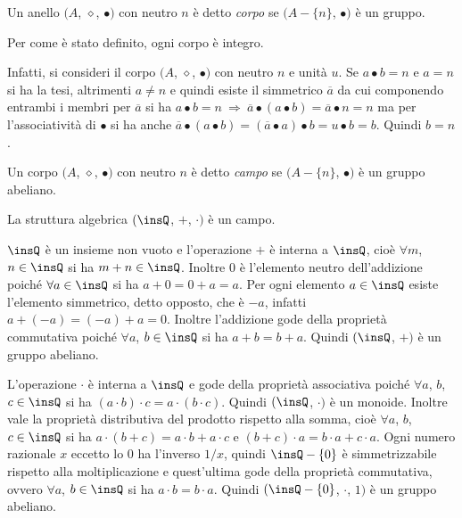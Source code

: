\begin{definizione}
Un anello $(A$, $\diamond$, $\bullet)$ con neutro $n$ è detto \emph{corpo} se $(A-\{n\}$, $\bullet)$ è un gruppo.
\end{definizione}

Per come è stato definito, ogni corpo è integro.

Infatti, si consideri il corpo $(A$, $\diamond$, $\bullet)$ con neutro $n$ e unità $u$.
 Se $a \bullet b = n$ e $a = n$ si ha la tesi, altrimenti $a \neq n$ e quindi esiste il simmetrico $\overline{a}$ da cui componendo entrambi i membri per $\overline{a}$ si ha $a \bullet b = n \:\Rightarrow\: \overline{a} \bullet (a \bullet b) = \overline{a} \bullet n = n$ ma per l'associatività di $\bullet$ si ha anche $\overline{a} \bullet (a \bullet b) = (\overline{a} \bullet a) \bullet b = u \bullet b = b$. Quindi $b = n$.

\begin{definizione}
Un corpo $(A$, $\diamond$, $\bullet)$ con neutro $n$ è detto \emph{campo} se $(A-\{n\}$, $\bullet)$ è un gruppo abeliano.
\end{definizione}

\begin{exrig}
 \begin{esempio}
La struttura algebrica $(\insQ$, $+$, $\cdot)$ è un campo.

$\insQ$ è un insieme non vuoto e l'operazione $+$ è interna a $\insQ$, cioè $\forall m$, $n \in \insQ$ si ha $m+n \in \insQ$. Inoltre 0 è l'elemento neutro dell'addizione poiché $\forall a \in \insQ$ si ha $a+0=0+a=a$. Per ogni elemento $a \in \insQ$ esiste l'elemento simmetrico, detto opposto, che è $-a$, infatti $a + (-a) = (-a) + a = 0$. Inoltre l'addizione gode della proprietà commutativa poiché $\forall a$, $b \in \insQ$ si ha $a+b=b+a$. Quindi $(\insQ$, $+)$ è un gruppo abeliano.

L'operazione $\cdot$ è interna a $\insQ$ e gode della proprietà associativa poiché $\forall a$, $b$, $c\in\insQ$ si ha $(a\cdot b)\cdot c=a\cdot (b\cdot c)$. Quindi $(\insQ$, $\cdot)$ è un monoide.
Inoltre vale la proprietà distributiva del prodotto rispetto alla somma, cioè $\forall a$, $b$, $c \in \insQ$ si ha $a\cdot(b+c) = a\cdot b + a\cdot c$ e $(b+c)\cdot a = b\cdot a + c\cdot a$.
Ogni numero razionale $x$ eccetto lo 0 ha l'inverso $1/x$, quindi $\insQ-\{0\}$ è simmetrizzabile rispetto alla moltiplicazione e quest'ultima gode della proprietà commutativa, ovvero $\forall a$, $b\in\insQ$ si ha $a\cdot b=b \cdot a$. Quindi $(\insQ-\{0\}$, $\cdot$, $1)$ è un gruppo abeliano.
 \end{esempio}
\end{exrig}

\ovalbox{\risolvii \ref{ese:E.19}, \ref{ese:E.20}}

\newpage

\cleardoublepage
